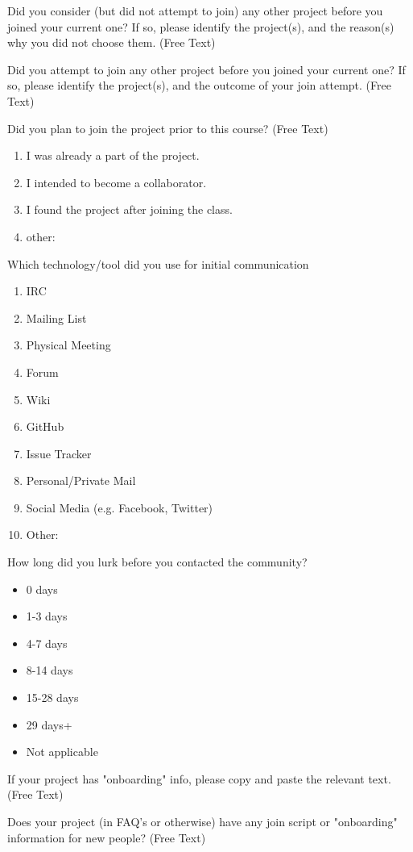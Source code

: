  Did you consider (but did not attempt to join) any other project before you joined your current one? If so, please identify the project(s), and the reason(s) why you did not choose them. (Free Text)

 Did you attempt to join any other project before you joined your current one? If so, please identify the project(s), and the outcome of your join attempt. (Free Text)

 Did you plan to join the project prior to this course? (Free Text)

\begin{enumerate}
\item  I was already a part of the project.
\item I intended to become a collaborator.
\item I found the project after joining the class.
\item other:
\end{enumerate}
 
Which technology/tool did you use for initial communication
\begin{enumerate}
\item IRC
\item Mailing List
\item Physical Meeting
\item Forum
\item Wiki
\item GitHub
\item Issue Tracker
\item Personal/Private Mail
\item Social Media (e.g. Facebook, Twitter)
\item Other:
\end{enumerate}

How long did you lurk before you contacted the community?
\begin{itemize}
\item 0 days
\item 1-3 days
\item 4-7 days
\item 8-14 days
\item 15-28 days
\item 29 days+
\item Not applicable 
\end{itemize}

If your project has "onboarding" info, please copy and paste the relevant text. (Free Text)

Does your project (in FAQ's or otherwise) have any join script or "onboarding" information for new people? (Free Text)

